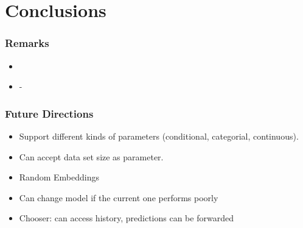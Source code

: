 \documentclass[10pt,handout]{beamer}
\begin{document}
\section{Conclusions}


\begin{frame}
\frametitle{Remarks}

\begin{itemize}[<+->]
	\item 
	\item -

\end{itemize}


\end{frame}


\begin{frame}
\frametitle{Future Directions}

\begin{itemize}
\item Support different kinds of parameters (conditional, categorial, continuous).
\item Can accept data set size as parameter.
\item Random Embeddings
\item Can change model if the current one performs poorly
\item Chooser: can access history, predictions can be forwarded
\end{itemize}

\end{frame}


%

%
\end{document}
